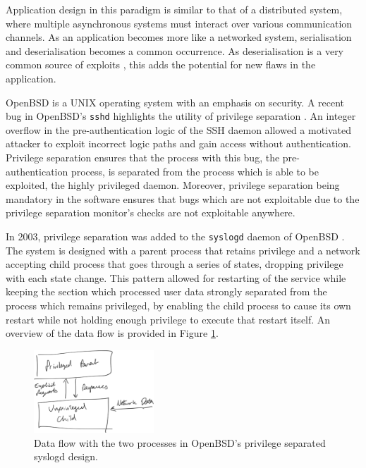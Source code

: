 \documentclass[12pt,a4paper,twoside]{report}
\begin{document}
Application design in this paradigm is similar to that of a distributed system, where multiple asynchronous systems must interact over various communication channels. As an application becomes more like a networked system, serialisation and deserialisation becomes a common occurrence. As deserialisation is a very common source of exploits \citep{the_mitre_corporation_deserialization_2006}, this adds the potential for new flaws in the application.

OpenBSD is a UNIX operating system with an emphasis on security. A recent bug in OpenBSD's \texttt{sshd} highlights the utility of privilege separation \citep{the_openbsd_foundation_openssh_2022}. An integer overflow in the pre-authentication logic of the SSH daemon allowed a motivated attacker to exploit incorrect logic paths and gain access without authentication. Privilege separation ensures that the process with this bug, the pre-authentication process, is separated from the process which is able to be exploited, the highly privileged daemon. Moreover, privilege separation being mandatory in the software ensures that bugs which are not exploitable due to the privilege separation monitor's checks are not exploitable anywhere.

In 2003, privilege separation was added to the \texttt{syslogd} daemon of OpenBSD \citep{madhavapeddy_privsepc_2003}. The system is designed with a parent process that retains privilege and a network accepting child process that goes through a series of states, dropping privilege with each state change. This pattern allowed for restarting of the service while keeping the section which processed user data strongly separated from the process which remains privileged, by enabling the child process to cause its own restart while not holding enough privilege to execute that restart itself. An overview of the data flow is provided in Figure \ref{fig:openbsd-syslogd-privsep}.

\begin{figure}
    \centering
    \includegraphics[width=0.4\textwidth]{figures/openbsd-syslogd-privsep.png}
    \caption{Data flow with the two processes in OpenBSD's privilege separated syslogd design.}
    \label{fig:openbsd-syslogd-privsep}
\end{figure}
\end{document}
